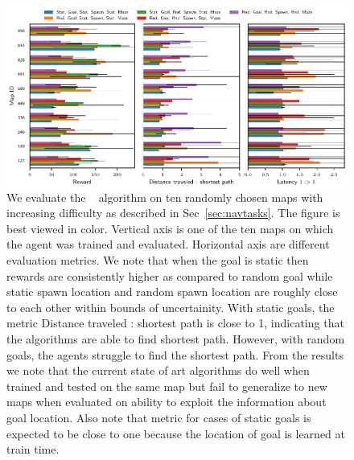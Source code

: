 \begin{figure}%
  \includegraphics[width=\linewidth]{images/plot_summary_bar_plots.pdf}%
  \caption{
    We evaluate the \NavAiiiCDiDiiL{}~\cite{MiPaViICLR2017} algorithm on ten randomly chosen maps with increasing difficulty as described in Sec~\ref{sec:navtasks}.
    The figure is best viewed in color.
    Vertical axis is one of the ten maps on which the agent was trained and evaluated.
    Horizontal axis are different evaluation metrics.
    We note that when the goal is static then rewards are consistently higher as compared to random goal while static spawn location and random spawn location are roughly close to each other within bounds of uncertainity.
    With static goals, the metric Distance traveled : shortest path is close to 1,
    indicating that the algorithms are able to find shortest path. However, with random goals, the agents struggle to find the shortest path.
    From the \LatencyOneGtOne{} results we note that the current state of art algorithms do well when trained and tested on the same map but fail to generalize to new maps when evaluated on ability to exploit the information about goal location.
    Also note that \LatencyOneGtOne{} metric for cases of static goals is expected to be close to one because the location of goal is learned at train time.
  }%
\label{fig:latency-goal-reward}%
\end{figure}
